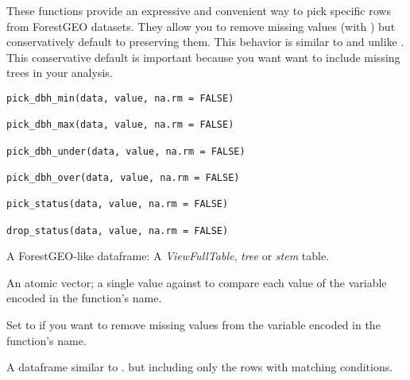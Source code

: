 \documentclass[a4paper]{book}
\begin{document}
%
\begin{Description}\relax
These functions provide an expressive and convenient way to pick specific
rows from ForestGEO datasets. They allow you to remove missing values (with
) but conservatively default to preserving them. This behavior
is similar to  and unlike . This
conservative default is important because you want want to include missing
trees in your analysis.
\end{Description}
%
\begin{Usage}
\begin{verbatim}
pick_dbh_min(data, value, na.rm = FALSE)

pick_dbh_max(data, value, na.rm = FALSE)

pick_dbh_under(data, value, na.rm = FALSE)

pick_dbh_over(data, value, na.rm = FALSE)

pick_status(data, value, na.rm = FALSE)

drop_status(data, value, na.rm = FALSE)
\end{verbatim}
\end{Usage}
%
\begin{Arguments}
\begin{ldescription}
\item[\code{data}] A ForestGEO-like dataframe: A \emph{ViewFullTable}, \emph{tree} or \emph{stem}
table.

\item[\code{value}] An atomic vector; a single value against to compare each value
of the variable encoded in the function's name.

\item[\code{na.rm}] Set to  if you want to remove missing values from the
variable encoded in the function's name.
\end{ldescription}
\end{Arguments}
%
\begin{Value}
A dataframe similar to . but including only the rows with
matching conditions.
\end{Value}
\end{document}
